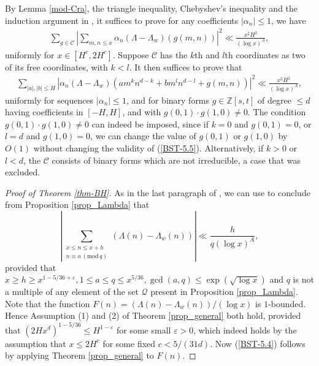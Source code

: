 \documentclass[reqno, 11pt]{amsart}
\renewcommand{\leq}{\leqslant}
\renewcommand{\geq}{\geqslant}
\theoremstyle{definition}
\theoremstyle{definition}
\renewcommand{\geq}{\geqslant}
\renewcommand{\leq}{\leqslant}
\renewcommand{\mod}{\mathrm{mod}\,}
\newcommand{\eps}{\varepsilon}
\newcommand{\CCC}{\mathcal{C}}
\newcommand{\ZZ}{\mathbb{Z}}
\numberwithin{equation}{section}
\begin{document}
By Lemma \ref{mod-Cra}, the triangle inequality, Chebyshev's inequality and the induction argument in \cite[Proof of Theorem 1.4]{BST}, it suffices to prove for any coefficients $|\alpha_n| \leq 1$, we have
\begin{align}\label{BST-5.4}
	\sum_{g \in \CCC} \left| \sum_{m, n \leq x} \alpha_n(\Lambda - \Lambda_w)(g(m,n)) \right|^2 \ll \frac{x^2H^2}{(\log x)^A},
\end{align}
uniformly for $x \in [H^c, 2H^c]$. Suppose $\CCC$ has the $k$th and $l$th coordinates as two of its free coordinates, with $k < l$. It then suffices to prove that
\begin{align}\label{BST-5.5}
	\sum_{|a|, |b| \leq H} \left| \alpha_n(\Lambda - \Lambda_w) (a m^{k}n^{d-k} + bm^ln^{d-l} + g(m,n)) \right|^2 \ll \frac{x^2H^2}{(\log x)^A},
\end{align}
uniformly for sequences $|\alpha_n| \leq 1$, and for binary forms $g \in \ZZ[s, t]$ of degree $\leq d$ having coefficients in $[-H, H]$, and with $g(0,1) \cdot g(1, 0) \neq 0$. The condition $g(0,1) \cdot g(1, 0) \neq 0$ can indeed be imposed, since if $k = 0$ and $g(0,1) = 0$, or $l = d$ and $g(1, 0) = 0$, we can change the value of $g(0, 1)$ or $g(1, 0)$ by $O(1)$ without changing the validity of (\ref{BST-5.5}). Alternatively, if $k > 0$ or $l < d$, the $\CCC$ consists of binary forms which are not irreducible, a case that was excluded.

\begin{proof}[Proof of Theorem \ref{thm-BH}]
	As in the last paragraph of \cite[Proof of Theorem 1.4]{BST}, we can use \cite[Fundamental lemma 6.3]{Iwa-Kow} to conclude from Proposition \ref{prop_Lambda} that
$$\left| \sum_{\substack{x \leq n \leq x + h \\ n \equiv a \, (\mod q)}} (\Lambda(n) - \Lambda_w(n)) \right| \ll \frac{h}{q(\log x)^A},$$
provided that $x \geq h \geq x^{1-5/36+\eps}, 1 \leq a \leq q \leq x^{5/36}, \gcd(a, q) \leq \exp(\sqrt{\log x})$ and $q$ is not a multiple of any element of the set $\mathcal{Q}$ present in Proposition \ref{prop_Lambda}. Note that the function $F(n) = (\Lambda(n) - \Lambda_w(n))/(\log x)$ is $1$-bounded. Hence Assumption (1) and (2) of Theorem \ref{prop_general} both hold, provided that $(2Hx^d)^{1-5/36} \leq H^{1-\eps}$ for some small $\eps>0$, which indeed holds by the assumption that $x \leq 2H^c$ for some fixed $c < 5/(31d)$. Now (\ref{BST-5.4}) follows by applying Theorem \ref{prop_general} to $F(n)$.

\end{proof}
\end{document}
